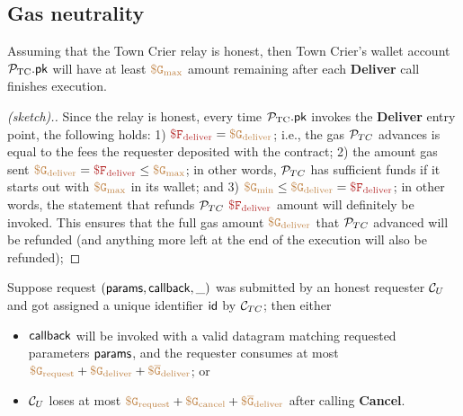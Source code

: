 \subsection{Gas neutrality}

\begin{theorem}
Assuming that the Town Crier relay is honest, 
then Town Crier's wallet account ${\mathcal{P}}_{\text{TC}}.{\sf pk}$ 
will have at least $\tt {\color{brown} \$ G_{\text{max}} }$
amount remaining after each {\bf Deliver}  
call finishes execution.
\end{theorem}
\begin{proof}[(sketch).]
Since the relay is honest, every time 
${\mathcal{P}}_{\text{TC}}.{\sf pk}$ invokes the {\bf Deliver}
entry point, the following holds:
1) 
$\smaroon{\$ F_{\text{deliver}}}
= \sbrown{\$ G_{\text{deliver}}}$;
i.e., the gas ${\cal P}_{TC}$ advances is equal
to the fees the 
requester deposited with the \tcont contract;
2)
the amount gas sent 
$\sbrown{\$ G_{\text{deliver}}} = 
\smaroon{\$ F_{\text{deliver}}}
\leq 
\sbrown{\$ G_{\text{max}}} 
$;
in other words, 
${\cal P}_{TC}$ has sufficient funds  
if it starts out with $\tt {\color{brown} \$ G_{\text{max}} }$
in its wallet;
and
3) 
$\sbrown{\$ G_{\text{min}}} \leq
\sbrown{\$ G_{\text{deliver}}} = 
\smaroon{\$ F_{\text{deliver}}}
$; in other words, the statement that refunds
${\cal P}_{TC}$ 
$\smaroon{\$ F_{\text{deliver}}}$
amount will definitely be invoked. This 
ensures that the full gas amount 
$\tt {\color{brown} \$ G_{\text{deliver}} }$
that ${\cal P}_{TC}$ advanced will be refunded (and anything more left
at the end of the execution will also be refunded);
\end{proof}





\begin{theorem}
Suppose request $({\sf params}, {\sf callback}, \_)$ was submitted
by an honest requester ${\cal C}_U$ and got assigned a unique identifier
${\sf id}$ by ${\cal C}_{TC}$;
then 
either 
\begin{itemize}
\item ${\sf callback}$ will be invoked  
with a valid datagram matching requested parameters
${\sf params}$,
and the requester consumes at most
$\tt {\color{brown} \$ G_{\text{request}} } + \tt {\color{brown} \$ G_{\text{deliver}} } + 
\tt {\color{brown} \$ \overline{G}_{\text{deliver}} }$;
or 
\item
${\cal C}_U$ 
loses at most 
$\tt {\color{brown} \$ G_{\text{request}} } + \tt {\color{brown} \$ G_{\text{cancel}} } + 
\tt {\color{brown} \$ \overline{G}_{\text{deliver}} }$ after calling {\bf Cancel}.
\end{itemize}
\end{theorem}

